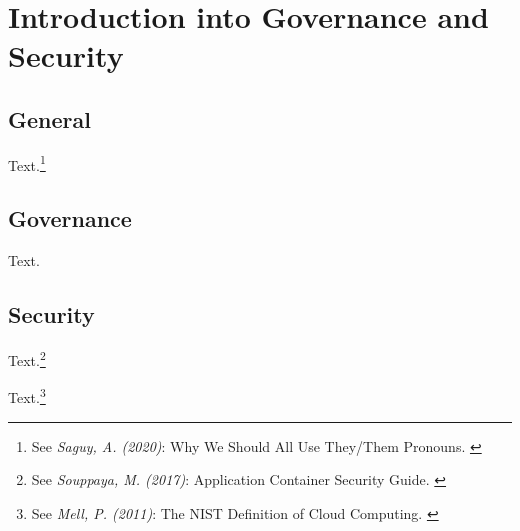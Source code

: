 %
%

\pagebreak
\section{Introduction into Governance and Security}

\onehalfspacing

\subsection{General}

Text.\footnote{See \textit{Saguy, A. (2020)}: Why We Should All Use They/Them Pronouns. \cite{pronouns}}

\subsection{Governance}

Text.

\subsection{Security}

Text.\footnote{See \textit{Souppaya, M. (2017)}: Application Container Security Guide. \cite{sp800-190}}

Text.\footnote{See \textit{Mell, P. (2011)}: The NIST Definition of Cloud Computing. \cite{sp800-145}}
